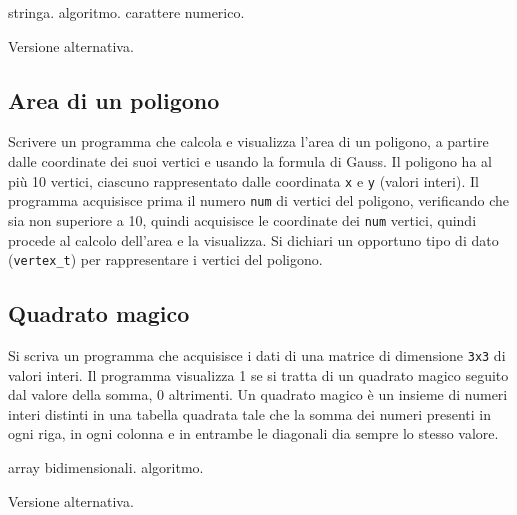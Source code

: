 \begin{tags}
stringa. algoritmo. carattere numerico.
\end{tags}



Versione alternativa.



\subsection{Area di un poligono}
Scrivere un programma che calcola e visualizza l'area di un poligono, a partire dalle coordinate dei suoi vertici e usando la formula di Gauss.
Il poligono ha al pi\`u 10 vertici, ciascuno rappresentato dalle coordinata \texttt{x} e \texttt{y} (valori interi).
Il programma acquisisce prima il numero \texttt{num} di vertici del poligono, verificando che sia non superiore a 10, quindi acquisisce le coordinate dei \texttt{num} vertici, quindi procede al calcolo dell'area e la visualizza.
Si dichiari un opportuno tipo di dato (\texttt{vertex\_t}) per rappresentare i vertici del poligono.




\subsection{Quadrato magico}
Si scriva un programma che acquisisce i dati di una matrice di dimensione \texttt{3x3} di valori interi. Il programma visualizza 1 se si tratta di un quadrato magico seguito dal valore della somma, 0 altrimenti.
Un quadrato magico \`e un insieme di numeri interi distinti in una tabella quadrata tale che la somma dei numeri presenti in ogni riga, in ogni colonna e in entrambe le diagonali dia sempre lo stesso valore.

\begin{tags}
array bidimensionali. algoritmo.
\end{tags}



Versione alternativa.



